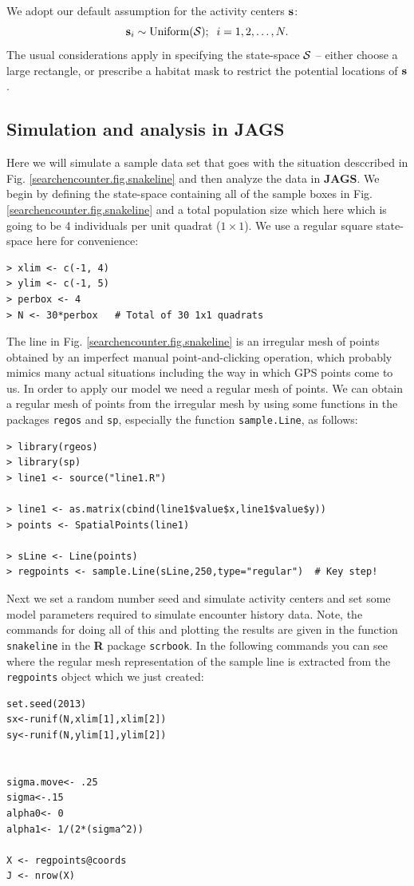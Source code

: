 We adopt our default assumption for the activity centers ${\bf s}$:
\[
 {\bf s}_{i} \sim \mbox{Uniform}({\cal S}); \; \; i=1,2,\ldots,N.
\]
The usual considerations apply in specifying the state-space ${\cal
  S}$ -- either choose a large rectangle, or prescribe a habitat mask
to restrict the potential locations of ${\bf s}$.



\subsection{Simulation and analysis in {\bf JAGS}}

Here we will simulate a sample data set that goes with the situation
desccribed in Fig. \ref{searchencounter.fig.snakeline} and then analyze the data in
{\bf JAGS}.  We begin by defining the state-space containing all of
the sample boxes in Fig. \ref{searchencounter.fig.snakeline} and a total population
size which here which is going to be 4 individuals per unit quadrat
($1 \times 1$). We use a regular square state-space here for
convenience:
\begin{verbatim}
> xlim <- c(-1, 4)
> ylim <- c(-1, 5)
> perbox <- 4
> N <- 30*perbox   # Total of 30 1x1 quadrats
\end{verbatim}
The line in Fig. \ref{searchencounter.fig.snakeline}  is an irregular mesh of points
obtained by an imperfect manual point-and-clicking operation, which
probably mimics many actual situations including the way in which GPS
points come to us. In order to apply our model we need a regular mesh
of points. We can obtain a regular mesh of points from the irregular
mesh by using
some functions in the packages \mbox{\tt regos}
and \mbox{\tt sp}, especially the function \mbox{\tt sample.Line}, as follows:
\begin{verbatim}
> library(rgeos)
> library(sp)
> line1 <- source("line1.R")

> line1 <- as.matrix(cbind(line1$value$x,line1$value$y))
> points <- SpatialPoints(line1)

> sLine <- Line(points)
> regpoints <- sample.Line(sLine,250,type="regular")  # Key step!
\end{verbatim}
Next we set a random number seed and simulate activity centers and set
some model parameters required to simulate encounter history data.
Note, the commands for doing all of this and plotting the results are given
in the function \mbox{\tt snakeline} in the {\bf R} package
\mbox{\tt scrbook}. 
In the following commands you can see where the
regular mesh representation of the sample line is extracted from the
\mbox{\tt regpoints} object which we just created:
\begin{verbatim}
set.seed(2013)
sx<-runif(N,xlim[1],xlim[2])
sy<-runif(N,ylim[1],ylim[2])


sigma.move<- .25
sigma<-.15
alpha0<- 0
alpha1<- 1/(2*(sigma^2))

X <- regpoints@coords
J <- nrow(X)
\end{verbatim}

